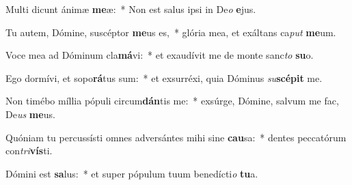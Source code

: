 \item Multi dicunt ánimæ \textbf{me}æ:~* Non est salus ipsi in De\textit{o} \textbf{e}jus.
\item Tu autem, Dómine, suscéptor \textbf{me}us es,~* glória mea, et exáltans ca\textit{put} \textbf{me}um.
\item Voce mea ad Dóminum cla\textbf{má}vi:~* et exaudívit me de monte sanc\textit{to} \textbf{su}o.
\item Ego dormívi, et sopo\textbf{rá}tus sum:~* et exsurréxi, quia Dóminus \textit{su}\textbf{scé}\textbf{pit} me.
\item Non timébo míllia pópuli circum\textbf{dán}tis me:~* exsúrge, Dómine, salvum me fac, De\textit{us} \textbf{me}us.
\item Quóniam tu percussísti omnes adversántes mihi sine \textbf{cau}sa:~* dentes peccatórum con\textit{tri}\textbf{vís}ti.
\item Dómini est \textbf{sa}lus:~* et super pópulum tuum benedícti\textit{o} \textbf{tu}a.
